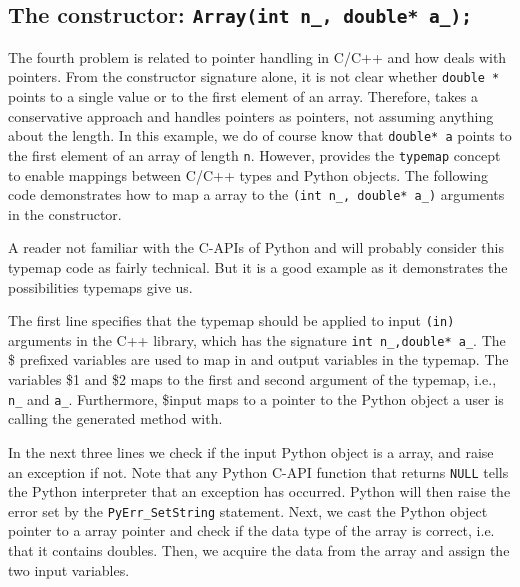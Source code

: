 \subsection{The constructor: \texttt{Array(int n\_, double* a\_);}}
The fourth problem is related to pointer handling in C/C++ and how \swig deals with pointers. From the constructor signature alone, it is not clear whether \texttt{double *} points to a single value or to the first element of an array.
Therefore, \swig takes a conservative approach and handles pointers as pointers, not assuming anything about the length. In this example, we do of course know that \texttt{double* a} points to the first element of an array of length \texttt{n}. However, \swig provides the \texttt{typemap} concept to enable mappings between C/C++ types and Python objects. The following code demonstrates how to map a \numpy array to the \texttt{(int n\_, double* a\_)} arguments in the constructor.
A reader not familiar with the C-APIs of Python and \numpy will probably consider this typemap code as fairly technical. But it is a good example as it demonstrates the possibilities typemaps give us.\par
The first line specifies that the typemap should be applied to input \texttt{(in)} arguments in the C++ library, which has the signature \texttt{int n\_,double* a\_}. The \$ prefixed variables are used to map in and output variables in the typemap. The variables \$1 and \$2 maps to the first and second argument of the typemap, i.e., \texttt{n\_} and \texttt{a\_}. Furthermore, \$input maps to a pointer to the Python object a user is calling the \swig generated method with. \par
In the next three lines we check if the input Python object is a \numpy array, and raise an exception if not.
Note that any Python C-API function that returns \texttt{NULL} tells the Python interpreter that an exception has occurred. Python will then raise the error set by the \texttt{PyErr\_SetString} statement. Next, we cast the Python object pointer to a \numpy array pointer and check if the data type of the \numpy array is correct, i.e. that it contains doubles. Then, we acquire the data from the \numpy array and assign the two input variables.\par

